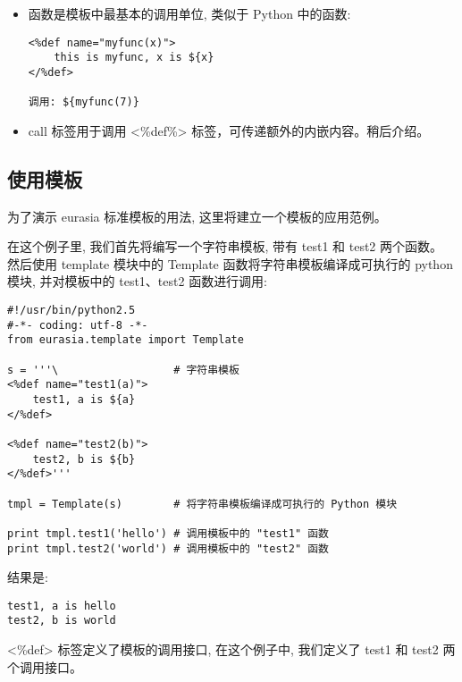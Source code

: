 \documentclass{manual}
\begin{document}
\begin{itemize}
\item {}

函数是模板中最基本的调用单位, 类似于 Python 中的函数:

\begin{verbatim}
<%def name="myfunc(x)">
    this is myfunc, x is ${x}
</%def>

调用: ${myfunc(7)}
\end{verbatim}

\item {}

call 标签用于调用 <\%def\%> 标签，可传递额外的内嵌内容。稍后介绍。

\end{itemize}

\subsection{使用模板}

为了演示 eurasia 标准模板的用法, 这里将建立一个模板的应用范例。

在这个例子里, 我们首先将编写一个字符串模板, 带有 test1 和 test2 两个函数。
然后使用 template 模块中的 Template 函数将字符串模板编译成可执行的 python 模块,
并对模板中的 test1、test2 函数进行调用:

\begin{verbatim}
#!/usr/bin/python2.5
#-*- coding: utf-8 -*-
from eurasia.template import Template

s = '''\                  # 字符串模板
<%def name="test1(a)">
	test1, a is ${a}
</%def>

<%def name="test2(b)">
	test2, b is ${b}
</%def>'''

tmpl = Template(s)        # 将字符串模板编译成可执行的 Python 模块

print tmpl.test1('hello') # 调用模板中的 "test1" 函数
print tmpl.test2('world') # 调用模板中的 "test2" 函数
\end{verbatim}

结果是:

\begin{verbatim}
test1, a is hello
test2, b is world
\end{verbatim}

<\%def> 标签定义了模板的调用接口, 在这个例子中, 我们定义了 test1 和 test2 两个调用接口。

\end{document}
